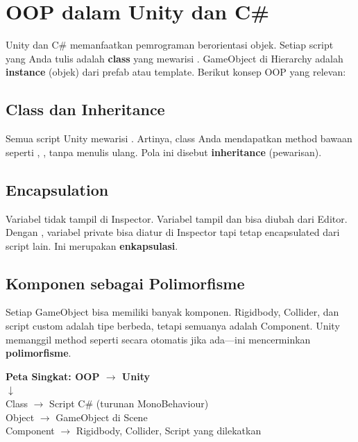 \section{OOP dalam Unity dan C\#}

Unity dan C\# memanfaatkan pemrograman berorientasi objek. Setiap script yang Anda tulis adalah \textbf{class} yang mewarisi . GameObject di Hierarchy adalah \textbf{instance} (objek) dari prefab atau template. Berikut konsep OOP yang relevan:

\subsection{Class dan Inheritance}

Semua script Unity mewarisi . Artinya, class Anda mendapatkan method bawaan seperti , ,  tanpa menulis ulang. Pola ini disebut \textbf{inheritance} (pewarisan).

\subsection{Encapsulation}

Variabel  tidak tampil di Inspector. Variabel  tampil dan bisa diubah dari Editor. Dengan \keyword{[SerializeField]}, variabel private bisa diatur di Inspector tapi tetap encapsulated dari script lain. Ini merupakan \textbf{enkapsulasi}.

\subsection{Komponen sebagai Polimorfisme}

Setiap GameObject bisa memiliki banyak komponen. Rigidbody, Collider, dan script custom adalah tipe berbeda, tetapi semuanya adalah Component. Unity memanggil method seperti  secara otomatis jika ada---ini mencerminkan \textbf{polimorfisme}.

\begin{center}
\textbf{Peta Singkat: OOP $\rightarrow$ Unity}\\
$\downarrow$\\
Class $\rightarrow$ Script C\# (turunan MonoBehaviour)\\
Object $\rightarrow$ GameObject di Scene\\
Component $\rightarrow$ Rigidbody, Collider, Script yang dilekatkan
\end{center}
